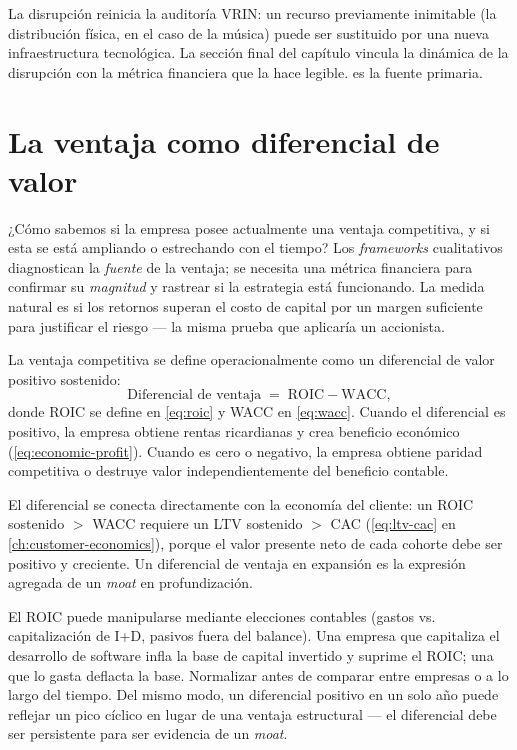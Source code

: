 La disrupción reinicia la auditoría VRIN: un recurso previamente inimitable (la distribución
física, en el caso de la música) puede ser sustituido por una nueva infraestructura tecnológica.
La sección final del capítulo vincula la dinámica de la disrupción con la métrica financiera
que la hace legible. \textcite{christensen1997} es la fuente primaria.

\section{La ventaja como diferencial de valor}\label{sec:advantage-spread}

¿Cómo sabemos si la empresa posee actualmente una ventaja competitiva, y si esta se está
ampliando o estrechando con el tiempo? Los \emph{frameworks} cualitativos diagnostican la
\emph{fuente} de la ventaja; se necesita una métrica financiera para confirmar su
\emph{magnitud} y rastrear si la estrategia está funcionando. La medida natural es si los
retornos superan el costo de capital por un margen suficiente para justificar el riesgo ---
la misma prueba que aplicaría un accionista.

La ventaja competitiva se define operacionalmente como un diferencial de valor positivo
sostenido:
\begin{equation}\label{eq:advantage-spread}
  \text{Diferencial de ventaja} \;=\; \mathrm{ROIC} - \mathrm{WACC},
\end{equation}
donde ROIC se define en \cref{eq:roic} y WACC en \cref{eq:wacc}. Cuando el diferencial es
positivo, la empresa obtiene rentas ricardianas y crea beneficio económico
(\cref{eq:economic-profit}). Cuando es cero o negativo, la empresa obtiene paridad
competitiva o destruye valor independientemente del beneficio contable.

El diferencial se conecta directamente con la economía del cliente: un ROIC sostenido
$>$ WACC requiere un LTV sostenido $>$ CAC (\cref{eq:ltv-cac} en \cref{ch:customer-economics}),
porque el valor presente neto de cada cohorte debe ser positivo y creciente. Un diferencial de
ventaja en expansión es la expresión agregada de un \emph{moat} en profundización.

El ROIC puede manipularse mediante elecciones contables (gastos vs. capitalización de I+D,
pasivos fuera del balance). Una empresa que capitaliza el desarrollo de software infla la base
de capital invertido y suprime el ROIC; una que lo gasta deflacta la base. Normalizar antes de
comparar entre empresas o a lo largo del tiempo. Del mismo modo, un diferencial positivo en un
solo año puede reflejar un pico cíclico en lugar de una ventaja estructural --- el diferencial
debe ser persistente para ser evidencia de un \emph{moat}.


